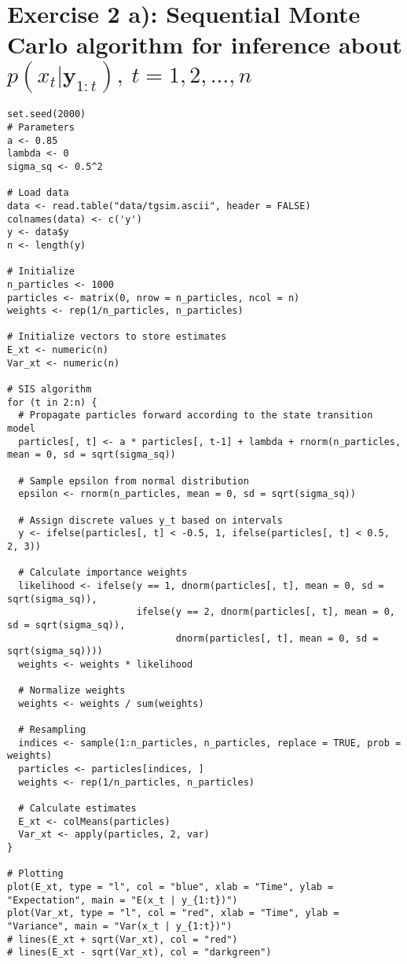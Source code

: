 \section*{Exercise 2 a): Sequential Monte Carlo algorithm for inference about $p(x_t | \boldsymbol{y}_{1:t}), \ t= 1, 2, \ldots, n$}
\begin{tcolorbox}[colback=white!95!black,colframe=white!50!black, breakable]
\begin{lstlisting}[caption={Exercise 2a}, label={lst:MC_2a}]
set.seed(2000)
# Parameters
a <- 0.85
lambda <- 0
sigma_sq <- 0.5^2

# Load data
data <- read.table("data/tgsim.ascii", header = FALSE)
colnames(data) <- c('y')
y <- data$y
n <- length(y)

# Initialize
n_particles <- 1000
particles <- matrix(0, nrow = n_particles, ncol = n)
weights <- rep(1/n_particles, n_particles)

# Initialize vectors to store estimates
E_xt <- numeric(n)
Var_xt <- numeric(n)

# SIS algorithm
for (t in 2:n) {
  # Propagate particles forward according to the state transition model
  particles[, t] <- a * particles[, t-1] + lambda + rnorm(n_particles, mean = 0, sd = sqrt(sigma_sq))
  
  # Sample epsilon from normal distribution
  epsilon <- rnorm(n_particles, mean = 0, sd = sqrt(sigma_sq))
  
  # Assign discrete values y_t based on intervals
  y <- ifelse(particles[, t] < -0.5, 1, ifelse(particles[, t] < 0.5, 2, 3))
  
  # Calculate importance weights
  likelihood <- ifelse(y == 1, dnorm(particles[, t], mean = 0, sd = sqrt(sigma_sq)),
                       ifelse(y == 2, dnorm(particles[, t], mean = 0, sd = sqrt(sigma_sq)),
                              dnorm(particles[, t], mean = 0, sd = sqrt(sigma_sq))))
  weights <- weights * likelihood
  
  # Normalize weights
  weights <- weights / sum(weights)
  
  # Resampling
  indices <- sample(1:n_particles, n_particles, replace = TRUE, prob = weights)
  particles <- particles[indices, ]
  weights <- rep(1/n_particles, n_particles)
  
  # Calculate estimates
  E_xt <- colMeans(particles)
  Var_xt <- apply(particles, 2, var)
}

# Plotting
plot(E_xt, type = "l", col = "blue", xlab = "Time", ylab = "Expectation", main = "E(x_t | y_{1:t})")
plot(Var_xt, type = "l", col = "red", xlab = "Time", ylab = "Variance", main = "Var(x_t | y_{1:t})")
# lines(E_xt + sqrt(Var_xt), col = "red")
# lines(E_xt - sqrt(Var_xt), col = "darkgreen")
\end{lstlisting}
\end{tcolorbox}
\vspace{15mm}
